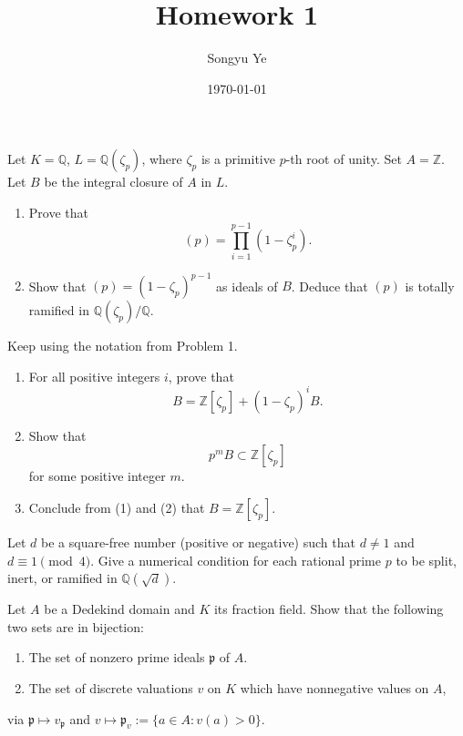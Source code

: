 \documentclass[12pt]{article}  %
\title{Homework 1}
\author{Songyu Ye}
\date{\today}
\begin{document}
\psettitle

\begin{problem}{1}
Let $K = \mathbb{Q}$, $L = \mathbb{Q}(\zeta_p)$, where $\zeta_p$ is a primitive $p$-th root of unity.  
Set $A = \mathbb{Z}$. Let $B$ be the integral closure of $A$ in $L$.

\begin{enumerate}
    \item Prove that
    \[
        (p) = \prod_{i=1}^{p-1} (1 - \zeta_p^i).
    \]

    \item Show that $(p) = (1 - \zeta_p)^{p-1}$ as ideals of $B$.  
    Deduce that $(p)$ is totally ramified in $\mathbb{Q}(\zeta_p)/\mathbb{Q}$.
\end{enumerate}
\end{problem}

\begin{problem}{2}
Keep using the notation from Problem 1.

\begin{enumerate}
    \item For all positive integers $i$, prove that
    \[
        B = \mathbb{Z}[\zeta_p] + (1-\zeta_p)^i B.
    \]

    \item Show that
    \[
        p^m B \subset \mathbb{Z}[\zeta_p]
    \]
    for some positive integer $m$.

    \item Conclude from (1) and (2) that $B = \mathbb{Z}[\zeta_p]$.
\end{enumerate}
\end{problem}

\begin{problem}{3}
Let $d$ be a square-free number (positive or negative) such that $d \neq 1$ and $d \equiv 1 \pmod{4}$.  
Give a numerical condition for each rational prime $p$ to be split, inert, or ramified in $\mathbb{Q}(\sqrt{d})$.
\end{problem}

\begin{problem}{4}
Let $A$ be a Dedekind domain and $K$ its fraction field. Show that the following two sets are in bijection:
\begin{enumerate}
    \item The set of nonzero prime ideals $\mathfrak{p}$ of $A$.
    \item The set of discrete valuations $v$ on $K$ which have nonnegative values on $A$,
\end{enumerate}
via $\mathfrak{p} \mapsto v_{\mathfrak{p}}$ and $v \mapsto \mathfrak{p}_v := \{ a \in A : v(a) > 0 \}$.
\end{problem}
\end{document}
